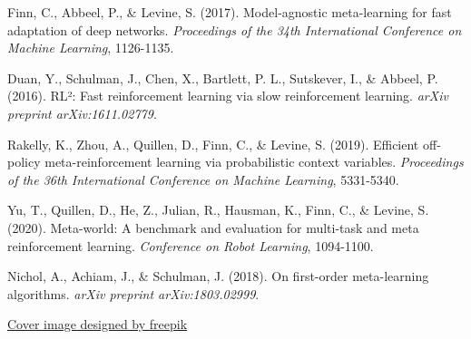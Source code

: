 \documentclass[12pt]{article}
\begin{document}
{{			\begin{thebibliography}{9}
				
				Finn, C., Abbeel, P., \& Levine, S. (2017). Model-agnostic meta-learning for fast adaptation of deep networks. \textit{Proceedings of the 34th International Conference on Machine Learning}, 1126-1135.
				
				Duan, Y., Schulman, J., Chen, X., Bartlett, P. L., Sutskever, I., \& Abbeel, P. (2016). RL²: Fast reinforcement learning via slow reinforcement learning. \textit{arXiv preprint arXiv:1611.02779}.
				
				Rakelly, K., Zhou, A., Quillen, D., Finn, C., \& Levine, S. (2019). Efficient off-policy meta-reinforcement learning via probabilistic context variables. \textit{Proceedings of the 36th International Conference on Machine Learning}, 5331-5340.
				
				Yu, T., Quillen, D., He, Z., Julian, R., Hausman, K., Finn, C., \& Levine, S. (2020). Meta-world: A benchmark and evaluation for multi-task and meta reinforcement learning. \textit{Conference on Robot Learning}, 1094-1100.
				
				Nichol, A., Achiam, J., \& Schulman, J. (2018). On first-order meta-learning algorithms. \textit{arXiv preprint arXiv:1803.02999}.
				
				\href{https://www.freepik.com/free-vector/cute-artificial-intelligence-robot-isometric-icon_16717130.htm}{Cover image designed by freepik}
				
			\end{thebibliography}
			
	}}
	
	
\end{document}
